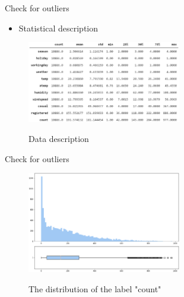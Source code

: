 \documentclass[
 size=14pt,
 paper=smartboard,  %
 mode=present, 		%
 display=slides, 	%
 style=tuliplab,  	%
 pauseslide,
 fleqn,leqno]{powerdot}
\begin{document}
\begin{slide}{Check for outliers}

\begin{itemize}
\item
Statistical description
\end{itemize}

\begin{figure}
  \centering
  \includegraphics[width=0.6\textwidth]{figures//description.eps}\\
  \bigskip
  \caption{Data description}\label{fig:OutAspect-target}
\end{figure}


\end{slide}


\begin{slide}[toc=,bm=]{Check for outliers}


\begin{figure}
  \centering
  \includegraphics[width=0.6\textwidth]{figures//Count_distribution.eps}\\
  \caption{The distribution of the label "count"}\label{fig:OutAspect-target}
\end{figure}


\end{slide}
\end{document}
